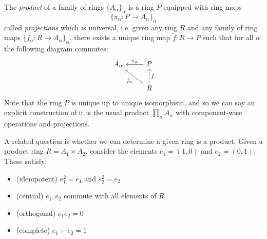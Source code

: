 \documentclass[12pt]{article}
\begin{document}
\begin{definition}
	The \emph{product} of a family of rings $\{A_\alpha\}_\alpha$ is a ring $P$ equipped with ring maps 
	\begin{equation*}
		\{\pi_\alpha: P\to A_\alpha\}_\alpha
	\end{equation*}
	called \emph{projections} which is universal, i.e. given any ring $R$ and any family of ring maps $\{f_\alpha:R\to A_\alpha\}_\alpha$, there exists a unique ring map $\tilde{f}:R\to P$ such that for all $\alpha$ the following diagram commutes:
	\begin{equation*}
		\begin{tikzcd}
		A_\alpha & P \arrow[l, "\pi_\alpha"']                               \\
				 & R \arrow[lu, "f_\alpha"] \arrow[u, "\tilde{f}"', dashed]
		\end{tikzcd}
	\end{equation*}
	Note that the ring $P$ is unique up to unique isomorphism, and so we can say an explicit construction of it is the usual product $\prod_\alpha A_\alpha$ with component-wise operations and projections.
\end{definition}

A related question is whether we can determine a given ring is a product. Given a product ring $R=A_1\times A_2$, consider the elements $e_1=(1,0)$ and $e_2=(0,1)$. These satisfy:
\begin{itemize}
	\item (idempotent) $e_1^2=e_1$ and $e_2^2=e_2$
	\item (central) $e_1,e_2$ commute with all elements of $R$
	\item (orthogonal) $e_1e_2=0$
	\item (complete) $e_1+e_2=1$
\end{itemize}
\end{document}
